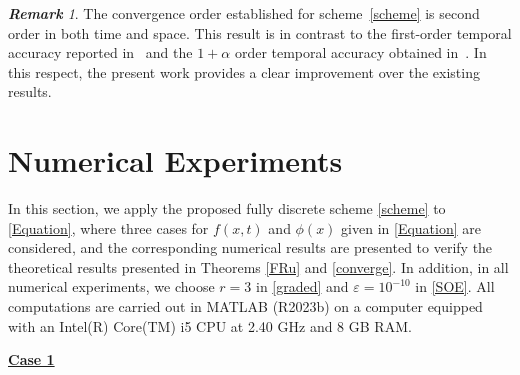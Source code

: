 \documentclass[10pt, reqno]{amsart}
\theoremstyle{remark}
\newtheorem{rem}{\bf Remark}[section]
\theoremstyle{definition}
\numberwithin{table}{section}
\begin{document}
\begin{rem}
    The convergence order established for scheme~\eqref{scheme} is second order in both time and space. This result is in contrast to the first-order temporal accuracy reported in~\cite{cao2020} and the 
$1+\alpha$ order temporal accuracy obtained in~\cite{qiao2022}. In this respect, the present work provides a clear improvement over the existing results.
    \end{rem}
\section{Numerical Experiments}\label{section4}
 In this section, we apply the proposed fully discrete scheme \eqref{scheme} to \eqref{Equation}, where three cases for $f(x,t)$ and $\phi(x)$ given in \eqref{Equation} are considered, and the corresponding numerical results are presented to verify the theoretical results presented in Theorems \ref{FRu} and \ref{converge}. In addition, in all numerical experiments, we choose $r = 3$ in \eqref{graded} and $\varepsilon = 10^{-10}$ in \eqref{SOE}. All computations are carried out in MATLAB (R2023b) on a computer equipped with an Intel(R) Core(TM) i5 CPU at 2.40 GHz and 8 GB RAM.


\noindent\textbf{\underline{Case 1}}
\end{document}
